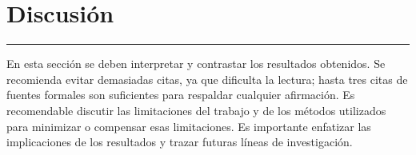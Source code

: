
\chapter{Discusi\'on}\label{capit:cap4}
\vspace{-2.0325ex}%
\noindent
\rule{\textwidth}{0.5pt}
\vspace{-5.5ex}%
\newcommand{\pushline}{\Indp}%


En esta sección se deben interpretar y contrastar los resultados obtenidos. Se recomienda evitar demasiadas citas, ya que dificulta la lectura; hasta tres citas de fuentes formales son suficientes para respaldar cualquier afirmación. Es recomendable discutir las limitaciones del trabajo y de los métodos utilizados para minimizar o compensar esas limitaciones. Es importante enfatizar las implicaciones de los resultados y trazar futuras líneas de investigación.





\newpage
